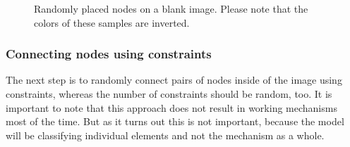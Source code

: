 \begin{figure}
\begin{subfigure}[b]{0.19\textwidth}
    \end{subfigure}
    \begin{subfigure}[b]{0.19\textwidth}
    \end{subfigure}
    \caption[Randomly placed nodes on blank image]{Randomly placed nodes on a blank image. Please note that the colors of these samples are inverted. }\label{fig:constraint_data_step1}
\end{figure}


\subsubsection{Connecting nodes using constraints}

The next step is to randomly connect pairs of nodes inside of the image using constraints, whereas the number of constraints should be random, too.
It is important to note that this approach does not result in working mechanisms most of the time.
But as it turns out this is not important, because the model will be classifying individual elements and not the mechanism as a whole.

